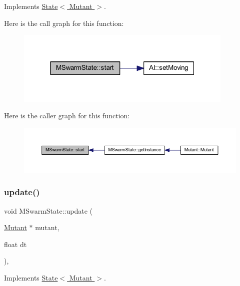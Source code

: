 Implements \hyperlink{class_state_abc29d36b0462a306ac9b32f36571d783}{State$<$ Mutant $>$}.

Here is the call graph for this function\+:
\nopagebreak
\begin{figure}[H]
\begin{center}
\leavevmode
\includegraphics[width=295pt]{class_m_swarm_state_a16fbf13f8cb9436570eb97e829befc3e_cgraph}
\end{center}
\end{figure}
Here is the caller graph for this function\+:
\nopagebreak
\begin{figure}[H]
\begin{center}
\leavevmode
\includegraphics[width=350pt]{class_m_swarm_state_a16fbf13f8cb9436570eb97e829befc3e_icgraph}
\end{center}
\end{figure}
\mbox{\label{class_m_swarm_state_a7e4abd7da613e0a3d013e149c37f8e40}} 
\subsubsection{\texorpdfstring{update()}{update()}}
{\footnotesize\ttfamily void M\+Swarm\+State\+::update (\begin{DoxyParamCaption}\item[{\hyperlink{class_mutant}{Mutant} $\ast$}]{mutant,  }\item[{float}]{dt }\end{DoxyParamCaption})\hspace{0.3cm}{\ttfamily [override]}, {\ttfamily [virtual]}}



Implements \hyperlink{class_state_a30b5f87ed3e3a05fafeaf898e43518ea}{State$<$ Mutant $>$}.

